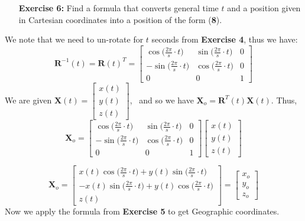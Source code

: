 \documentclass[11pt]{article}
\theoremstyle{definition}
\newcommand{\1}[1]{\mathbf{1} \left \{ #1 \right \}}
\begin{document}
\begin{itemize}
\item[{\textbf{Exercise 6:}}] Find a formula that converts general time $t$ and a position given in Cartesian coordinates into a position of the form (\textbf{8}).
\end{itemize}
We note that we need to un-rotate for $t$ seconds from \textbf{Exercise 4}, thus we have:
\[\textbf{R}^{-1}(t) = \textbf{R}(t)^T = \begin{bmatrix}
\cos \big(\frac{2\pi}{s} \cdot t\big) & \sin \big(\frac{2\pi}{s} \cdot t\big) & 0 \\ -\sin \big(\frac{2\pi}{s} \cdot t\big) & \cos \big(\frac{2\pi}{s} \cdot t\big) & 0 \\ 0 & 0 & 1 \end{bmatrix}\]
We are given \(\textbf{X}(t) = \begin{bmatrix}
x(t) \\ y(t) \\ z(t) \end{bmatrix}\), \ and so we have \(\textbf{X}_o = \textbf{R}^T(t) \textbf{X}(t)\).  Thus,
\[\textbf{X}_o = \begin{bmatrix}
\cos \big(\frac{2\pi}{s} \cdot t\big) & \sin \big(\frac{2\pi}{s} \cdot t\big) & 0 \\ -\sin \big(\frac{2\pi}{s} \cdot t\big) & \cos \big(\frac{2\pi}{s} \cdot t\big) & 0 \\ 0 & 0 & 1 \end{bmatrix}
\begin{bmatrix} x(t) \\ y(t) \\ z(t) \end{bmatrix}\]

\[\textbf{X}_o = \begin{bmatrix}
x(t)\cos \big(\frac{2\pi}{s} \cdot t\big) + y(t)\sin \big(\frac{2\pi}{s} \cdot t\big) \\ -x(t)\sin \big(\frac{2\pi}{s} \cdot t\big) + y(t)\cos \big(\frac{2\pi}{s} \cdot t\big) \\ z(t)
\end{bmatrix}
= \begin{bmatrix} x_o \\ y_o \\ z_o \end{bmatrix}\]
Now we apply the formula from \textbf{Exercise 5} to get Geographic coordinates.
\end{document}
